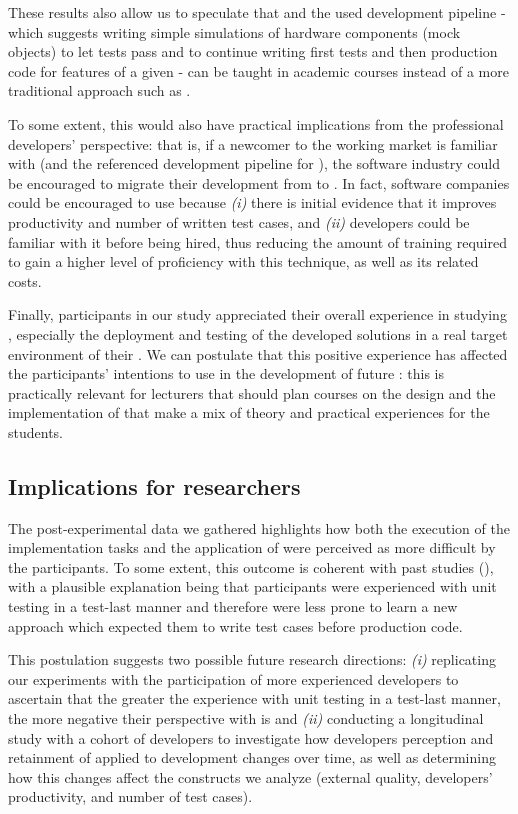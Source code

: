 These results also allow us to speculate that \tdd and the used development pipeline \cite{TDDEC} - which suggests writing simple simulations of hardware components (\ie mock objects) to let tests pass and to continue writing first tests and then production code for features of a given \es - can be taught in academic \es courses instead of a more traditional approach such as \notdd.

To some extent, this would also have practical implications from the professional developers' perspective: that is, if a newcomer to the working market is familiar with \tdd (and the referenced development pipeline for \ess), the software industry could be encouraged to migrate their development from \notdd to \tdd. In fact, software companies could be encouraged to use \tdd because \textit{(i)} there is initial evidence that it improves productivity and number of written test cases, and \textit{(ii)} developers could be familiar with it before being hired, thus reducing the amount of training required to gain a higher level of proficiency with this technique, as well as its related costs.

Finally, participants in our study appreciated their overall experience in studying \tdd, especially the deployment and testing of the developed solutions in a real target environment of their \es. 
We can postulate that this positive experience has affected the participants' intentions to use \tdd in the development of future \ess: this is practically relevant for lecturers that should plan courses on the design and the implementation of \ess that make a mix of theory and practical experiences for the students.

\subsection{Implications for researchers} 
The post-experimental data we gathered highlights how both the execution of the implementation tasks and the application of \tdd were perceived as more difficult by the participants. 
To some extent, this outcome is coherent with past studies (\eg \cite{DBLP:conf/xpu/0001SBFC20, DBLP:conf/esem/RomanoZBPS22}), with a plausible explanation being that participants were experienced with unit testing in a test-last manner and therefore were less prone to learn a new approach which expected them to write test cases before production code. 

This postulation suggests two possible future research directions: \textit{(i)} replicating our experiments with the participation of more experienced developers to ascertain that the greater the experience with unit testing in a test-last manner, the more negative their perspective with \tdd is and \textit{(ii)} conducting a longitudinal study with a cohort of developers to investigate how developers perception and retainment of \tdd applied to \es development changes over time, as well as determining how this changes affect the constructs we analyze (\ie external quality, developers' productivity, and number of test cases).

